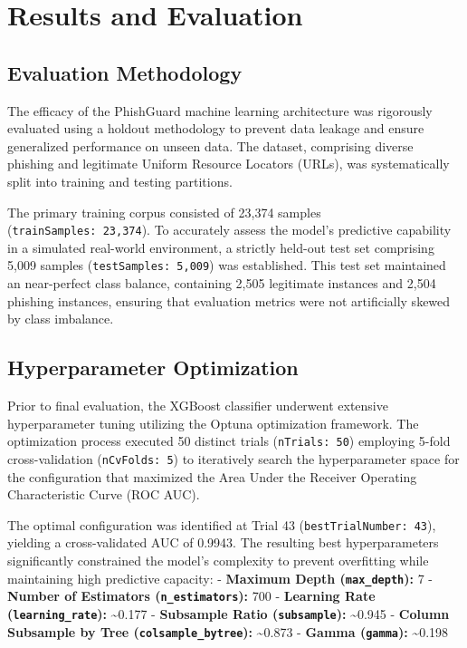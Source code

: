 \chapter{Results and
Evaluation}
\label{chapter-10-results-and-evaluation}

\section{Evaluation Methodology}\label{evaluation-methodology}

The efficacy of the PhishGuard machine learning architecture was
rigorously evaluated using a holdout methodology to prevent data leakage
and ensure generalized performance on unseen data. The dataset,
comprising diverse phishing and legitimate Uniform Resource Locators
(URLs), was systematically split into training and testing partitions.

The primary training corpus consisted of 23,374 samples
(\texttt{trainSamples:\ 23,374}). To accurately assess the model's
predictive capability in a simulated real-world environment, a strictly
held-out test set comprising 5,009 samples
(\texttt{testSamples:\ 5,009}) was established. This test set maintained
an near-perfect class balance, containing 2,505 legitimate instances and
2,504 phishing instances, ensuring that evaluation metrics were not
artificially skewed by class imbalance.

\section{Hyperparameter
Optimization}\label{hyperparameter-optimization}

Prior to final evaluation, the XGBoost classifier underwent extensive
hyperparameter tuning utilizing the Optuna optimization framework. The
optimization process executed 50 distinct trials (\texttt{nTrials:\ 50})
employing 5-fold cross-validation (\texttt{nCvFolds:\ 5}) to iteratively
search the hyperparameter space for the configuration that maximized the
Area Under the Receiver Operating Characteristic Curve (ROC AUC).

The optimal configuration was identified at Trial 43
(\texttt{bestTrialNumber:\ 43}), yielding a cross-validated AUC of
0.9943. The resulting best hyperparameters significantly constrained the
model's complexity to prevent overfitting while maintaining high
predictive capacity: - \textbf{Maximum Depth (\texttt{max\_depth}):} 7 -
\textbf{Number of Estimators (\texttt{n\_estimators}):} 700 -
\textbf{Learning Rate (\texttt{learning\_rate}):} \textasciitilde0.177 -
\textbf{Subsample Ratio (\texttt{subsample}):} \textasciitilde0.945 -
\textbf{Column Subsample by Tree (\texttt{colsample\_bytree}):}
\textasciitilde0.873 - \textbf{Gamma (\texttt{gamma}):}
\textasciitilde0.198

